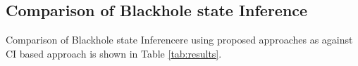 \documentclass[journal]{IEEEtran}
\begin{document}
\begin{table}[t]
\begin{center}
\begin{tabular}{|p{0.5cm}|p{0.75cm}|p{0.75cm}|p{0.75cm}|p{0.75cm}|p{1cm}|p{0.5cm}|p{0.75cm}|}
\hline
			\end{tabular}
			\label{tab:results_1}
		\end{center}
	\end{table}
	
\subsection{Comparison of Blackhole state Inference}
Comparison of Blackhole state Inferencere using proposed approaches as against CI based approach \cite{Adegoke2018} is shown in Table \ref{tab:results}.
\end{document}
